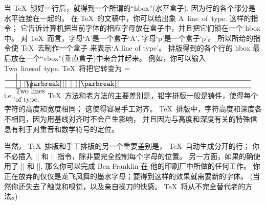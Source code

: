 当 \TeX\ 锁好一行后，就得到一个所谓的``hbox''(水平盒子),
因为行的各个部分是水平连接在一起的。%
在 \TeX\ 的文稿中，你可以给出象
\begintt
\hbox{A line of type.}
\endtt
这样的指令；
它告诉计算机把当前字体的相应字母放在盒子中，并且把它们锁在一个 hbox 中。
对 \TeX\ 而言，字母`A'是一个盒子`\thinspace{}\hbox{A}\maketypebox\thinspace',
字母`p'是一个盒子`\thinspace{}\hbox{p}\maketypebox\thinspace'。
\1所以所给的指令使 \TeX\ 去制作一个盒子
\begindisplay
{}
\enddisplay
来表示`A line of type'。%
排版得到的各个行的 hbox 最后放在一个``vbox''(垂直盒子)中来合并起来。%
例如，你可以输入
\begintt
\vbox{\hbox{Two lines}\hbox{of type.}}
\endtt
\TeX\ 将把它转变为
\begindisplay%
  =\vbox{\hbox{}\hbox{}}
$\vcenter{\hbox{\makelightbox\kern-\wd0\box0}}$\qquad
  i.e.,\qquad$\vcenter{\vbox{\hbox{Two lines}\hbox{of type.}}}$
\enddisplay
\TeX\ 方法和老方法的主要差别是，铅字排版一般是铸件，使得每个字符的高度和宽度相同；
这使得容易手工对齐。%
\TeX\ 排版中，字符高度和深度各不相同，因为用基线对齐时不会产生影响，
并且因为与高度和深度有关的特殊信息有利于对重音和数学符号的定位。

当然， \TeX\ 排版和手工排版的另一个重要差别是，
\TeX\ 自动生成分开的行；
你不必插入 |\hbox| 和 |\vbox| 指令，除非要完全控制每个字母的位置。%
另一方面，如果的确使用了 |\hbox| 和 |\vbox|, 那么你可以完成 Ben {Franklin} 在%
他的印刷厂中所做的任何工作。%
你正在放弃的仅仅是龙飞凤舞的墨水字母；要得到这样的效果就需要新的字体。%
(当然你还失去了触觉和嗅觉，以及亲自操刀的快感。%
\TeX\ 将从不完全替代老的方法。)

